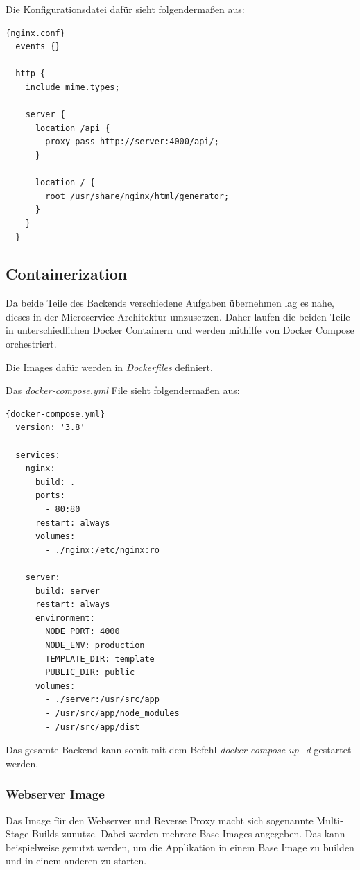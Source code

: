 Die Konfigurationsdatei dafür sieht folgendermaßen aus:

\begin{lstlisting}[label={lst:nginx.conf}]{nginx.conf}
  events {}

  http {
    include mime.types;

    server {
      location /api {
        proxy_pass http://server:4000/api/;
      }

      location / {
        root /usr/share/nginx/html/generator;
      }
    }
  }
\end{lstlisting}

\subsection{Containerization}
Da beide Teile des Backends verschiedene Aufgaben übernehmen lag es nahe, dieses in der Microservice
Architektur umzusetzen.
Daher laufen die beiden Teile in unterschiedlichen Docker Containern und werden mithilfe
von Docker Compose orchestriert.

Die Images dafür werden in \textit{Dockerfiles} definiert.

Das \textit{docker-compose.yml} File sieht folgendermaßen aus:

\begin{lstlisting}[label={lst:docker-compose.yml}]{docker-compose.yml}
  version: '3.8'

  services:
    nginx:
      build: .
      ports:
        - 80:80
      restart: always
      volumes:
        - ./nginx:/etc/nginx:ro

    server:
      build: server
      restart: always
      environment:
        NODE_PORT: 4000
        NODE_ENV: production
        TEMPLATE_DIR: template
        PUBLIC_DIR: public
      volumes:
        - ./server:/usr/src/app
        - /usr/src/app/node_modules
        - /usr/src/app/dist
\end{lstlisting}

Das gesamte Backend kann somit mit dem Befehl \textit{docker-compose up -d} gestartet werden.

\subsubsection{Webserver Image}
Das Image für den Webserver und Reverse Proxy macht sich sogenannte Multi-Stage-Builds zunutze.
Dabei werden mehrere Base Images angegeben.
Das kann beispielweise genutzt werden, um die Applikation in einem Base Image zu builden und in einem anderen
zu starten.

